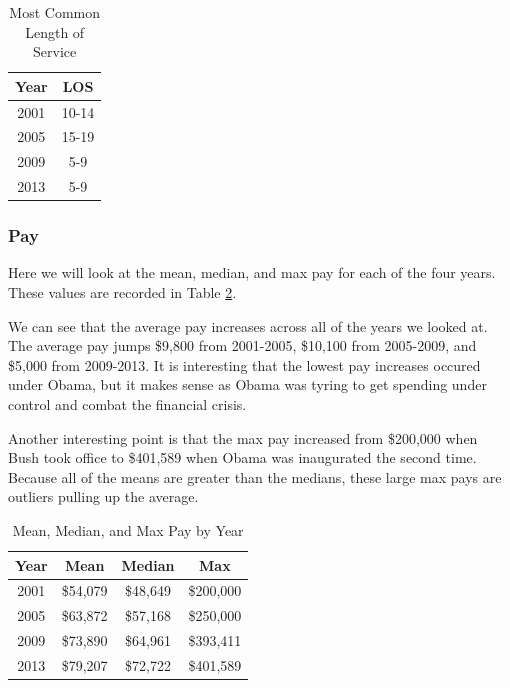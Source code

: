 \documentclass{article}
\begin{document}
            \begin{center}
                \begin{table}
                    \centering
                    \begin{tabular}{ |c|c| }
                        \hline
                        Year & LOS \\
                        \hline
                        2001 & 10-14 \\
                        2005 & 15-19 \\
                        2009 & 5-9 \\
                        2013 & 5-9 \\
                        \hline
                    \end{tabular}
                    \caption{Most Common Length of Service}
                    \label{tab:10}
                \end{table}
            \end{center}

        \subsubsection{Pay}
        Here we will look at the mean, median, and max pay for each of the four years. These values are recorded in Table \ref{tab:11}.
        \par
        We can see that the average pay increases across all of the years we looked at. The average pay jumps \$9,800 from 2001-2005, \$10,100 from 2005-2009, and \$5,000 from 2009-2013. It is interesting that the lowest pay increases occured under Obama, but it makes sense as Obama was tyring to get spending under control and combat the financial crisis.
        \par
        Another interesting point is that the max pay increased from \$200,000 when Bush took office to \$401,589 when Obama was inaugurated the second time. Because all of the means are greater than the medians, these large max pays are outliers pulling up the average.

            \begin{center}
                \begin{table}
                    \centering
                    \begin{tabular}{ |c|c|c|c| }
                        \hline
                        Year & Mean & Median & Max \\
                        \hline
                        2001 & \$54,079 & \$48,649 & \$200,000 \\
                        2005 & \$63,872 & \$57,168 & \$250,000 \\
                        2009 & \$73,890 & \$64,961 & \$393,411 \\
                        2013 & \$79,207 & \$72,722 & \$401,589 \\
                        \hline
                    \end{tabular}
                    \caption{Mean, Median, and Max Pay by Year}
                    \label{tab:11}
                \end{table}
            \end{center}
\end{document}
